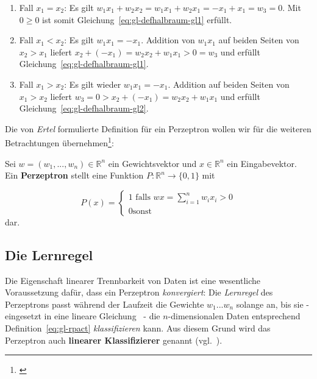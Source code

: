 \begin{enumerate}
    \item Fall $x_1 = x_2$: Es gilt $w_1x_1 + w_2x_2 = w_1x_1 + w_2x_1 = -x_1 + x_1 = w_3 = 0$. Mit $0 \geq 0$ ist somit Gleichung~\ref{eq:gl-defhalbraum-gl1} erfüllt.
    \item Fall $x_1 < x_2$: Es gilt $w_1x_1 = -x_1$. Addition von $w_1x_1$ auf beiden Seiten von $x_2 > x_1$ liefert $x_2 + (-x_1) = w_2x_2 + w_1x_1 > 0 = w_3$ und erfüllt Gleichung~\ref{eq:gl-defhalbraum-gl1}.
    \item Fall $x_1 > x_2$: Es gilt wieder $w_1x_1 = -x_1$. Addition auf beiden Seiten von $x_1 > x_2$ liefert $w_3 = 0 > x_2 + (-x_1) = w_2x_2 + w_1x_1$ und erfüllt Gleichung~\ref{eq:gl-defhalbraum-gl2}.
\end{enumerate}


\noindent
Die von \textit{Ertel} formulierte Definition für ein Perzeptron wollen wir für die weiteren Betrachtungen übernehmen\footnote{
    \cite[212, ``Definition 8.3``, Hervorhebungen i.O.]{Ert21a}
}:

\begin{definition}
\noindent
Sei $w = (w_1, ..., w_n) \in  \mathbb{R}^n$ ein Gewichtsvektor und $x \in  \mathbb{R}^n$ ein Eingabevektor. Ein \textbf{Perzeptron} stellt eine Funktion $P:  \mathbb{R}^n \to \{0, 1\}$ mit

\begin{equation}
P(x) = \begin{cases}
            1 \text{ falls } wx = \sum^n_{i=1} w_ix_i >0 \\
            0 \text{sonst}
\end{cases}
\end{equation}
\noindent
dar.

\end{definition}

\subsection{Die Lernregel}\label{sec-lernregel}

Die Eigenschaft linearer Trennbarkeit von Daten ist eine wesentliche Voraussetzung dafür, dass ein Perzeptron \textit{konvergiert}: Die \textit{Lernregel} des Perzeptrons passt während der Laufzeit die Gewichte $w_1 ... w_n$ solange an, bis sie - eingesetzt in eine lineare Gleichung~\cite[311]{Ert21b} - die $n$-dimensionalen Daten entsprechend Definition~\ref{eq:gl-rpact} \textit{klassifizieren} kann.
Aus diesem Grund wird das Perzeptron auch \textbf{linearer Klassifizierer} genannt (vgl.~\cite[210-216]{Ert21a}).

